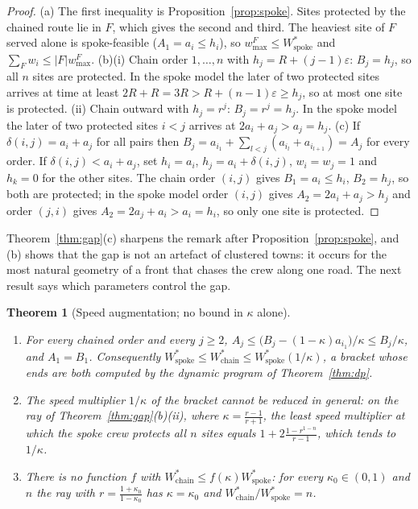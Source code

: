 \documentclass[pdflatex,sn-mathphys-ay]{sn-jnl}
\theoremstyle{thmstyleone}
\newtheorem{theorem}{Theorem}
\theoremstyle{thmstyletwo}
\theoremstyle{thmstylethree}
\begin{document}
\begin{proof}
(a) The first inequality is Proposition~\ref{prop:spoke}. Sites protected
by the chained route lie in $F$, which gives the second and third. The
heaviest site of $F$ served alone is spoke-feasible ($A_1=a_i\le h_i$), so
$w^F_{\max}\le W^\ast_{\mathrm{spoke}}$ and $\sum_Fw_i\le|F|w^F_{\max}$.
(b)(i) Chain order $1,\dots,n$ with $h_j=R+(j-1)\varepsilon$: $B_j=h_j$,
so all $n$ sites are protected. In the spoke model the later of two
protected sites arrives at time at least $2R+R=3R>R+(n-1)\varepsilon\ge h_j$, so
at most one site is protected. (ii) Chain outward with $h_j=r^j$:
$B_j=r^j=h_j$. In the spoke model the later of two protected sites
$i<j$ arrives at $2a_i+a_j>a_j=h_j$.
(c) If $\delta(i,j)=a_i+a_j$ for all pairs then
$B_j=a_{i_1}+\sum_{l<j}(a_{i_l}+a_{i_{l+1}})=A_j$ for every order. If
$\delta(i,j)<a_i+a_j$, set $h_i=a_i$, $h_j=a_i+\delta(i,j)$, $w_i=w_j=1$ and
$h_k=0$ for the other sites. The chain order $(i,j)$ gives $B_1=a_i\le h_i$,
$B_2=h_j$, so both are protected; in the spoke model order $(i,j)$ gives
$A_2=2a_i+a_j>h_j$ and order $(j,i)$ gives $A_2=2a_j+a_i>a_i=h_i$, so only
one site is protected. \end{proof}

Theorem~\ref{thm:gap}(c) sharpens the remark after
Proposition~\ref{prop:spoke}, and (b) shows that the gap is not an
artefact of clustered towns: it occurs for the most natural geometry of a
front that chases the crew along one road. The next result says which
parameters control the gap.

\begin{theorem}[Speed augmentation; no bound in $\kappa$ alone]\label{thm:speedaug}
\begin{enumerate}
\item[(a)] For every chained order and every $j\ge2$,
$A_j\le\bigl(B_j-(1-\kappa)a_{i_1}\bigr)/\kappa\le B_j/\kappa$, and $A_1=B_1$.
Consequently $W^\ast_{\mathrm{spoke}}\le W^\ast_{\mathrm{chain}}\le W^\ast_{\mathrm{spoke}}(1/\kappa)$,
a bracket whose ends are both computed by the dynamic program of
Theorem~\ref{thm:dp}.
\item[(b)] The speed multiplier $1/\kappa$ of the bracket cannot be reduced in general: on the ray
of Theorem~\ref{thm:gap}(b)(ii), where $\kappa=\frac{r-1}{r+1}$, the
least speed multiplier at which the spoke crew protects all $n$ sites
equals $1+2\frac{1-r^{1-n}}{r-1}$, which tends to $1/\kappa$.
\item[(c)] There is no function $f$ with $W^\ast_{\mathrm{chain}}\le f(\kappa)W^\ast_{\mathrm{spoke}}$: for every
$\kappa_0\in(0,1)$ and $n$ the ray with $r=\frac{1+\kappa_0}{1-\kappa_0}$ has
$\kappa=\kappa_0$ and $W^\ast_{\mathrm{chain}}/W^\ast_{\mathrm{spoke}}=n$.
\end{enumerate}
\end{theorem}
\end{document}
